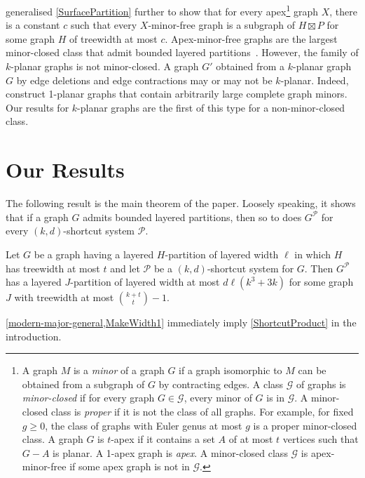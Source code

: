\documentclass{patmorin}
\newcommand{\PP}{\mathcal{P}}
\renewcommand{\geq}{\geqslant}
\begin{document}
\citet{dujmovic.joret.ea:planar} generalised \cref{SurfacePartition} further to show that for every apex\footnote{A graph $M$ is a \textit{minor} of a graph $G$ if a graph isomorphic to $M$ can be obtained from a subgraph of $G$ by contracting edges. A class $\mathcal{G}$ of graphs is \emph{minor-closed} if for every graph $G\in\mathcal{G}$, every minor of $G$ is in $\mathcal{G}$. A minor-closed class is \emph{proper} if it is not the class of all graphs. For example, for fixed $g\geq 0$, the class of graphs with Euler genus at most $g$ is a proper minor-closed class. A graph $G$ is $t$-apex if it contains a set $A$ of at most $t$ vertices such that $G-A$ is planar. A 1-apex graph is \emph{apex}.  A minor-closed class $\mathcal{G}$ is apex-minor-free if some apex graph is not in $\mathcal{G}$.}
 graph $X$, there is a constant $c$ such that every $X$-minor-free graph is a subgraph of $H\boxtimes P$ for some graph $H$ of treewidth at most $c$. Apex-minor-free graphs are the largest minor-closed class that admit bounded layered partitions~\citep{dujmovic.joret.ea:planar}. However, the family of $k$-planar graphs is not minor-closed.  A graph $G'$ obtained from a $k$-planar graph $G$ by edge deletions and edge contractions may or may not be $k$-planar. Indeed, \citet{dujmovic.eppstein.ea:structure} construct 1-planar graphs that contain arbitrarily large complete graph minors. Our results for $k$-planar graphs are the first of this type for a non-minor-closed class. 

\section{Our Results}

The following result is the main theorem of the paper. Loosely speaking, it shows that if a graph $G$ admits bounded layered partitions, then so to does $G^\PP$ for every $(k,d)$-shortcut system $\PP$. 

\begin{thm}\label{modern-major-general}
  Let $G$ be a graph having a layered $H$-partition of layered width $\ell$ in which $H$ has treewidth at most $t$ and let $\PP$ be a $(k,d)$-shortcut system for $G$.  Then $G^\PP$ has a layered $J$-partition of layered width at most $d\ell(k^3+3k)$ for some graph $J$ with treewidth at most $\binom{k+t}{t}-1$.
\end{thm}

\cref{modern-major-general,MakeWidth1} immediately imply \cref{ShortcutProduct} in the introduction.
\end{document}
